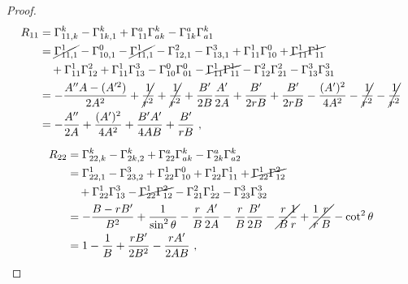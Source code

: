 \begin{proof}
        \begin{equation*}
        \begin{aligned}
            R_{11} & = \Gamma^k_{11,k} - \Gamma^k_{1k,1} + \Gamma^a_{11} \Gamma^k_{ak} - \Gamma^a_{1k} \Gamma^k_{a1} \\ & = \cancel{\Gamma^1_{11,1}} - \Gamma^0_{10,1} - \cancel{\Gamma^1_{11,1} } - \Gamma^2_{12,1} - \Gamma^3_{13,1} + \Gamma^1_{11} \Gamma^0_{10} + \cancel{\Gamma^1_{11} \Gamma^1_{11}} \\ & \quad  + \Gamma^1_{11} \Gamma^2_{12}  + \Gamma^1_{11} \Gamma^3_{13} - \Gamma^0_{10} \Gamma^0_{01}  - \cancel{\Gamma^1_{11} \Gamma^1_{11}}  - \Gamma^2_{12} \Gamma^2_{21} - \Gamma^3_{13} \Gamma^3_{31}  \\ & = - \frac{A''A - (A'^2)}{2A^2} + \cancel{\frac{1}{r^2}} + \cancel{\frac{1}{r^2}} + \frac{B'}{2B} \frac{A'}{2A} + \frac{B'}{2rB} + \frac{B'}{2rB} - \frac{(A')^2}{4A^2} - \cancel{\frac{1}{r^2}} - \cancel{\frac{1}{r^2}} \\ & = - \frac{A''}{2A} + \frac{(A')^2}{4A^2} + \frac{B'A'}{4AB} + \frac{B'}{rB} ~, 
        \end{aligned}
        \end{equation*}

        \begin{equation*}
        \begin{aligned}
            R_{22} & = \Gamma^k_{22,k} - \Gamma^k_{2k,2} + \Gamma^a_{22} \Gamma^k_{ak} - \Gamma^a_{2k} \Gamma^k_{a2} \\ & = \Gamma^1_{22,1} - \Gamma^3_{23,2} + \Gamma^1_{22} \Gamma^0_{10} + \Gamma^1_{22} \Gamma^1_{11} + \cancel{\Gamma^1_{22} \Gamma^2_{12}} \\ & \quad + \Gamma^1_{22} \Gamma^3_{13} - \cancel{\Gamma^1_{22} \Gamma^2_{12}} - \Gamma^2_{21} \Gamma^1_{22} - \Gamma^3_{23} \Gamma^3_{32} \\ & = - \frac{B-rB'}{B^2} + \frac{1}{\sin^2 \theta}  - \frac{r}{B} \frac{A'}{2A} - \frac{r}{B} \frac{B'}{2B} - \cancel{\frac{r}{B} \frac{1}{r}} + \cancel{\frac{1}{r} \frac{r}{B}} - \cot^2 \theta \\ & = 1 - \frac{1}{B} + \frac{rB'}{2B^2} - \frac{rA'}{2AB} ~, 
        \end{aligned}
        \end{equation*}


\end{proof}
